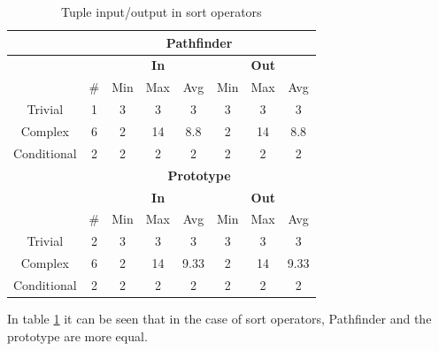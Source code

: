 \begin{table}[!htp]
 \begin{center}
 \begin{tabular}{| c | c | c | c | c | c | c | c |}
  \hline
   & \multicolumn{7}{|c|}{\textbf{Pathfinder}} \\
   \hline
   &  & \multicolumn{3}{|c|}{\textbf{In}} &
   \multicolumn{3}{|c|}{\textbf{Out}}  \\
   \hline
   &  \# & Min & Max & Avg & Min & Max & Avg\\
   \hline
   Trivial & 1 & 3 & 3 & 3 & 3 & 3 & 3  \\
   \hline
   Complex & 6 & 2 & 14 & 8.8 & 2 & 14 & 8.8  \\
   \hline
   Conditional & 2 & 2 & 2 & 2 & 2 & 2 & 2  \\
   \hline
   & \multicolumn{7}{|c|}{\textbf{Prototype}} \\
   \hline
   &  & \multicolumn{3}{|c|}{\textbf{In}} &
   \multicolumn{3}{|c|}{\textbf{Out}} \\
   \hline
   & \# & Min & Max & Avg & Min & Max & Avg \\
   \hline
   Trivial & 2 & 3 & 3 & 3 & 3 & 3 & 3 \\
   \hline
   Complex & 6 & 2 & 14 & 9.33 & 2 & 14 & 9.33 \\
   \hline
   Conditional & 2 & 2 & 2 & 2 & 2 & 2 & 2 \\
   \hline
 \end{tabular}
\caption{Tuple input/output in sort operators}
\label{table:result:complexity_matrix_tio_2}
 \end{center}
\end{table}

In table \ref{table:result:complexity_matrix_tio_2} it can be seen that in the
case of sort operators, Pathfinder and the prototype are more equal.
